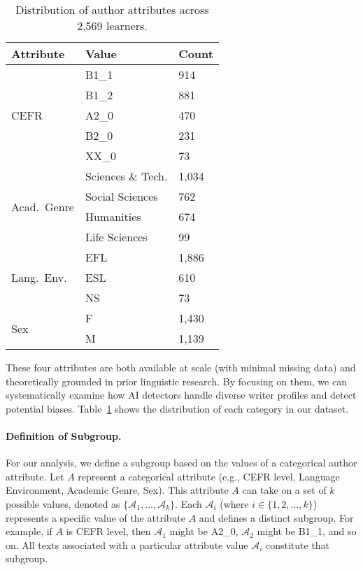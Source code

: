 \begin{table}[t]
\centering
\small
\begin{tabular}{lll}
\toprule
\textbf{Attribute} & \textbf{Value} & \textbf{Count} \\
\midrule
\multirow{5}{*}{CEFR}   
 & B1\_1 & 914 \\
 & B1\_2 & 881 \\
 & A2\_0 & 470 \\
 & B2\_0 & 231 \\
 & XX\_0 & 73 \\
\midrule
\multirow{4}{*}{Acad.\ Genre}  
 & Sciences \& Tech. & 1,034 \\
 & Social Sciences   & 762 \\
 & Humanities        & 674 \\
 & Life Sciences     & 99 \\
\midrule
\multirow{3}{*}{Lang.\ Env.}  
 & EFL & 1,886 \\
 & ESL & 610 \\
 & NS  & 73 \\
\midrule
\multirow{2}{*}{Sex}
 & F   & 1,430 \\
 & M   & 1,139 \\
\bottomrule
\end{tabular}
\caption{Distribution of author attributes across 2,569 learners.}
\label{tab:attribute_dist}
\end{table}







These four attributes are both available at scale (with minimal missing data) and theoretically grounded in prior linguistic research. By focusing on them, we can systematically examine how AI detectors handle diverse writer profiles and detect potential biases. Table~\ref{tab:attribute_dist} shows the distribution of each category in our dataset.


\paragraph{Definition of Subgroup.}  For our analysis, we define a subgroup based on the values of a categorical author attribute.  Let \(A\) represent a categorical attribute (e.g., CEFR level, Language Environment, Academic Genre, Sex).  This attribute \(A\) can take on a set of  \(k\) possible values, denoted as  \(\{\mathcal{A}_1, \ldots, \mathcal{A}_k\}\).  Each \(\mathcal{A}_i\) (where \(i \in \{1, 2, \ldots, k\}\)) represents a specific value of the attribute \(A\) and defines a distinct subgroup. For example, if \(A\) is CEFR level, then \(\mathcal{A}_1\) might be A2\_0, \(\mathcal{A}_2\) might be B1\_1, and so on.  All texts associated with a particular attribute value \(\mathcal{A}_i\) constitute that subgroup.

